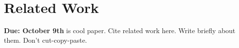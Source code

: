 \section{Related Work}\label{sec:related}
{\bf Due: October 9th}
\cite{threeages2015} is cool paper. Cite related work here. Write briefly about them. Don't cut-copy-paste. 